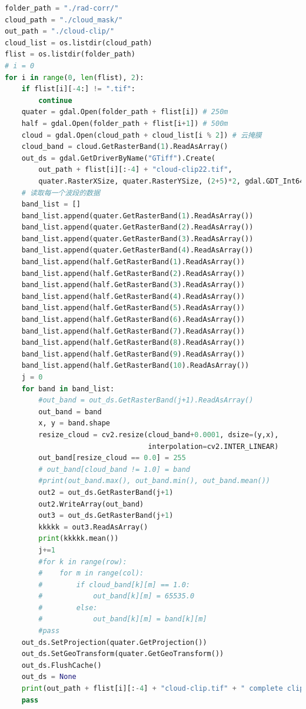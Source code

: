 \documentclass{ctexart}
\begin{document}
\begin{sloppypar}
\begin{appendices}
\begin{lstlisting}[frame=single, language=Python, basicstyle={\ttfamily}, caption={去云}, label=coderemove-cloud]
folder_path = "./rad-corr/"
cloud_path = "./cloud_mask/"
out_path = "./cloud-clip/"
cloud_list = os.listdir(cloud_path)
flist = os.listdir(folder_path)
# i = 0
for i in range(0, len(flist), 2):
    if flist[i][-4:] != ".tif":
        continue
    quater = gdal.Open(folder_path + flist[i]) # 250m  
    half = gdal.Open(folder_path + flist[i+1]) # 500m
    cloud = gdal.Open(cloud_path + cloud_list[i % 2]) # 云掩膜
    cloud_band = cloud.GetRasterBand(1).ReadAsArray()
    out_ds = gdal.GetDriverByName("GTiff").Create(
        out_path + flist[i][:-4] + "cloud-clip22.tif", 
        quater.RasterXSize, quater.RasterYSize, (2+5)*2, gdal.GDT_Int64)
    # 读取每一个波段的数据
    band_list = []
    band_list.append(quater.GetRasterBand(1).ReadAsArray())
    band_list.append(quater.GetRasterBand(2).ReadAsArray())
    band_list.append(quater.GetRasterBand(3).ReadAsArray())
    band_list.append(quater.GetRasterBand(4).ReadAsArray())
    band_list.append(half.GetRasterBand(1).ReadAsArray())
    band_list.append(half.GetRasterBand(2).ReadAsArray())
    band_list.append(half.GetRasterBand(3).ReadAsArray())
    band_list.append(half.GetRasterBand(4).ReadAsArray())
    band_list.append(half.GetRasterBand(5).ReadAsArray())
    band_list.append(half.GetRasterBand(6).ReadAsArray())
    band_list.append(half.GetRasterBand(7).ReadAsArray())
    band_list.append(half.GetRasterBand(8).ReadAsArray())
    band_list.append(half.GetRasterBand(9).ReadAsArray())
    band_list.append(half.GetRasterBand(10).ReadAsArray())
    j = 0
    for band in band_list:
        #out_band = out_ds.GetRasterBand(j+1).ReadAsArray()
        out_band = band
        x, y = band.shape
        resize_cloud = cv2.resize(cloud_band+0.0001, dsize=(y,x), 
                                  interpolation=cv2.INTER_LINEAR)
        out_band[resize_cloud == 0.0] = 255
        # out_band[cloud_band != 1.0] = band
        #print(out_band.max(), out_band.min(), out_band.mean())
        out2 = out_ds.GetRasterBand(j+1)
        out2.WriteArray(out_band)
        out3 = out_ds.GetRasterBand(j+1)
        kkkkk = out3.ReadAsArray()
        print(kkkkk.mean())
        j+=1
        #for k in range(row):
        #    for m in range(col):
        #        if cloud_band[k][m] == 1.0:
        #            out_band[k][m] = 65535.0
        #        else:
        #            out_band[k][m] = band[k][m]
        #pass
    out_ds.SetProjection(quater.GetProjection())
    out_ds.SetGeoTransform(quater.GetGeoTransform())
    out_ds.FlushCache()
    out_ds = None
    print(out_path + flist[i][:-4] + "cloud-clip.tif" + " complete clip!")
    pass


\end{lstlisting}
\end{appendices}
\end{sloppypar}
\end{document}
